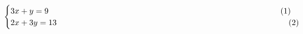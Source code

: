 \begin{equation*}
\begin{cases}
3x+y=9 \hspace{10cm} (1) \\
2x+3y=13 \hspace{10 cm} (2)\end{cases}
\end{equation*}               